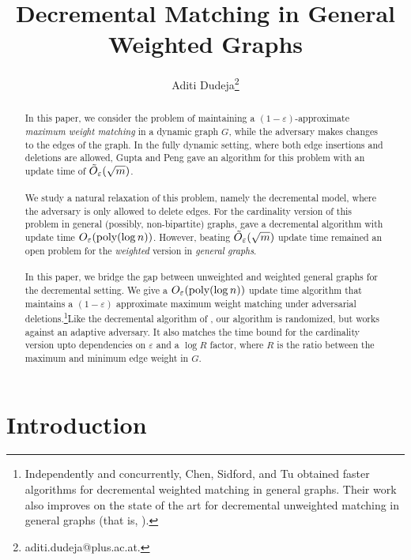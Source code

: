 \documentclass[a4paper,11pt]{article}
\title{Decremental Matching in General Weighted Graphs}
\author{Aditi Dudeja\thanks{aditi.dudeja@plus.ac.at.}}
\affil{Department of Computer Science, University of Salzburg}
\date{}
\newcommand{\poly}{\mbox{\rm poly}}
\newcommand{\eps}{\varepsilon}
\theoremstyle{definition}
\theoremstyle{definition}
\theoremstyle{definition}
\theoremstyle{definition}
\theoremstyle{definition}
\theoremstyle{definition}
\theoremstyle{definition}
\theoremstyle{definition}
\theoremstyle{definition}
\theoremstyle{definition}
\theoremstyle{definition}
\theoremstyle{definition}
\theoremstyle{definition}
\theoremstyle{definition}
\theoremstyle{definition}
\begin{document}
\maketitle

\begin{abstract}In this paper, we consider the problem of maintaining a $(1-\eps)$-approximate \emph{maximum weight matching} in a dynamic graph $G$, while the adversary makes changes to the edges of the graph. In the fully dynamic setting, where both edge insertions and deletions are allowed, Gupta and Peng \cite{GP13} gave an algorithm for this problem with an update time of $\Tilde{O}_{\eps}(\sqrt{m})$. \\ \\ 
We study a natural relaxation of this problem, namely the decremental model, where the adversary is only allowed to delete edges. For the cardinality version of this problem in general (possibly, non-bipartite) graphs, \cite{AssadiBD22} gave a decremental algorithm with update time $O_{\eps}(\poly(\log n))$. However, beating $\Tilde{O}_{\eps}(\sqrt{m})$ update time remained an open problem for the \emph{weighted} version in \emph{general graphs}.\\ \\
In this paper, we bridge the gap between unweighted and weighted general graphs for the decremental setting. We give a $O_{\eps}(\poly(\log n))$ update time algorithm that maintains a $(1-\eps)$ approximate maximum weight matching under adversarial deletions.\footnote{Independently and concurrently, Chen, Sidford, and Tu \cite{ChenST23} obtained faster algorithms for decremental weighted matching in general graphs. Their work also improves on the state of the art for decremental unweighted matching in general graphs (that is, \cite{AssadiBD22}).}Like the decremental algorithm of \cite{AssadiBD22}, our algorithm is randomized, but works against an adaptive adversary. It also matches the time bound for the cardinality version upto dependencies on $\eps$ and a $\log R$ factor, where $R$ is the ratio between the maximum and minimum edge weight in $G$. \end{abstract}


\section{Introduction}
\end{document}
